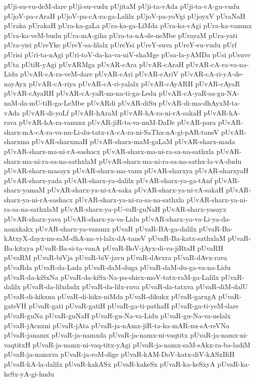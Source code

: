 {pUji-su-vu-deM-dare
pUji-su-vudu
pUjitaM
pUji-ta-vAda
pUji-ta-vA-gu-vudu
pUjoV-pa-cAraH
pUjoV-pa-cA-ra-ga-Lalilx
pUjoV-pa-yoVgi
pUjoyxV
pUraNaH
pUraka
pUrakaH
pUra-ka-gaLa
pUra-ka-ga-LiMda
pUra-ka-vAgi
pUra-ka-vanunx
pUra-ka-veM-budu
pUra-mA-giha
pUra-ta-nA-de-neMbe
pUrayaM
pUra-yati
pUra-yisi
pUreYke
pUreY-sa-lilalx
pUreYsi
pUreY-suva
pUreY-su-vudu
pUrf
pUrisi
pUri-ta-nAgi
pUri-toV-da-ka-va-niV-shaMge
pUsa-la-yAMDa
pUsi
pUsuve
pUta
pUtiR-yAgi
pUvARMga
pUvAR-cAra
pUvAR-cAraH
pUvAR-cA-ra-va-na-Lidu
pUvAR-cA-ra-veM-dare
pUvAR-cAri
pUvAR-cAriV
pUvAR-cA-ri-yA-de-nayAyx
pUvAR-cA-riya
pUvAR-cA-ri-yalalx
pUvAR-cAyARH
pUvAR-cAyaR
pUvAR-cAyaRH
pUvAR-cA-yaR-na-na-ti-ga-Ledu
pUvAR-cA-yaR-sa-gu-NA-naM-da-mU-tiR-ga-LeMbe
pUvARdi
pUvAR-diSu
pUvAR-di-ma-dhAyxM-ta-vAda
pUvAR-di-yoLf
pUvAR-hAraM
pUvAR-hA-ra-ni-rA-sakaH
pUvAR-hA-rava
pUvAR-hA-ra-vanunx
pUvAR-jiR-ta-va-nuM-DaDe
pUvAR-para
pUvAR-sharx-mA-cA-ra-va-nu-Li-du-tatx-rA-cA-ra-ni-SaThx-nA-gi-pAR-taneV
pUvAR-sharxma
pUvAR-sharxmaH
pUvAR-sharx-maM-gaLaM
pUvAR-sharx-mada
pUvAR-sharx-ma-ni-rA-sashacx
pUvAR-sharx-ma-ni-ra-sa-na-sathxla
pUvAR-sharx-ma-ni-ra-sa-na-sathxlaM
pUvAR-sharx-ma-ni-ra-sa-na-sathx-la-vA-dudu
pUvAR-sharx-masayx
pUvAR-sharx-ma-vanu
pUvAR-sharxya
pUvAR-sharxyaH
pUvAR-sharx-yada
pUvAR-sharx-ya-dalilx
pUvAR-sharx-ya-ga-tAnf
pUvAR-sharx-yamaM
pUvAR-sharx-ya-ni-rA-saka
pUvAR-sharx-ya-ni-rA-sakaH
pUvAR-sharx-ya-ni-rA-sashacx
pUvAR-sharx-ya-ni-ra-sa-na-sathxla
pUvAR-sharx-ya-ni-ra-sa-na-sathxlaM
pUvAR-sharx-ya-pU-vaR-guNaH
pUvAR-sharx-yasayx
pUvAR-sharx-yava
pUvAR-sharx-ya-va-Lidu
pUvAR-sharx-ya-va-Li-ya-da-nanxkakx
pUvAR-sharx-ya-vanunx
pUvaR
pUvaR-BA-ga-dalilx
pUvaR-Ba-kAtxyX-dayx-nu-saM-dhA-na-vi-lalx-dA-taneV
pUvaR-Ba-katx-sathxlaM
pUvaR-Ba-kitxya
pUvaR-Ba-si-ta-vanA
pUvaR-BoV-jAyx-di-va-jiRtaH
pUvaRH
pUvaRM
pUvaR-biVja
pUvaR-biV-javu
pUvaR-dAvxra
pUvaR-dAvx-rava
pUvaRda
pUvaR-da-Lada
pUvaR-daM-duga
pUvaR-daM-du-ga-va-na-Lidu
pUvaR-da-kiSxNa
pUvaR-da-kiSx-Na-pa-shicx-moV-tatx-raM-ga-Lalilx
pUvaR-dalilx
pUvaR-da-lilxdadx
pUvaR-da-lilx-ruva
pUvaR-da-tatxva
pUvaR-diM-dalU
pUvaR-di-kikxna
pUvaR-di-kikx-niMda
pUvaR-dikukx
pUvaR-garxgA
pUvaR-gateVH
pUvaR-gati
pUvaR-gatiH
pUvaR-ga-ti-pathaH
pUvaR-ga-ti-yeM-dare
pUvaR-guNa
pUvaR-guNaH
pUvaR-gu-Na-va-Lidu
pUvaR-gu-Na-va-nelalx
pUvaR-jAcnxni
pUvaR-jAta
pUvaR-ja-nAmx-jiR-ta-ka-mAR-nu-sA-reVNa
pUvaR-janamx
pUvaR-ja-namxda
pUvaR-ja-namx-ni-vaqtitx
pUvaR-ja-namx-ni-vaqtitxH
pUvaR-ja-namx-ni-vaq-titx-yAgi
pUvaR-ja-namx-saM-sAkx-ra-ba-ladiM
pUvaR-ja-namxva
pUvaR-ja-roM-dige
pUvaR-kAM-DoV-katx-diV-kASxBiH
pUvaR-kA-la-dalilx
pUvaR-kakASx
pUvaR-kakeSx
pUvaR-ka-keSxyA
pUvaR-ka-keSx-yA-gi-hudu
}
